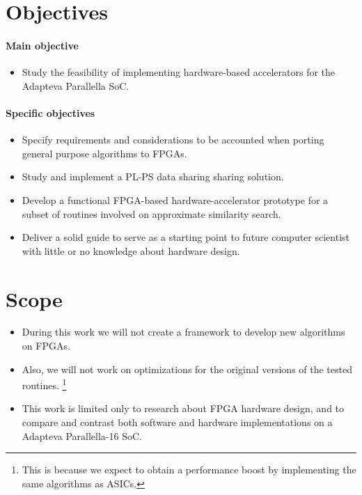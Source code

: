 \documentclass[11pt,letterpaper]{article}
\begin{document}
\section{Objectives}
\paragraph{Main objective}
\begin{itemize}
\item Study the feasibility of implementing hardware-based accelerators for the Adapteva Parallella SoC.
\end{itemize}

\paragraph{Specific objectives}
\begin{itemize}
    \item Specify requirements and considerations to be accounted when porting general purpose algorithms to FPGAs.
    \item Study and implement a PL-PS data sharing sharing solution.
    \item Develop a functional FPGA-based hardware-accelerator prototype for a subset of routines involved 
    on approximate similarity search.
    \item Deliver a solid guide to serve as a starting point to future computer scientist with little or no 
    knowledge about hardware design. 
\end{itemize}



\section{Scope}
\begin{itemize}
    \item During this work we will not create a framework to develop new algorithms on FPGAs. 
    \item Also, we will not work on optimizations for the original versions of the tested routines.
    \footnote{This is because we expect to obtain a performance boost by implementing the same algorithms as ASICs.}
    \item This work is limited only to research about FPGA hardware design, and to compare and contrast both 
        software and hardware implementations on a Adapteva Parallella-16 SoC.
\end{itemize}
\end{document}
